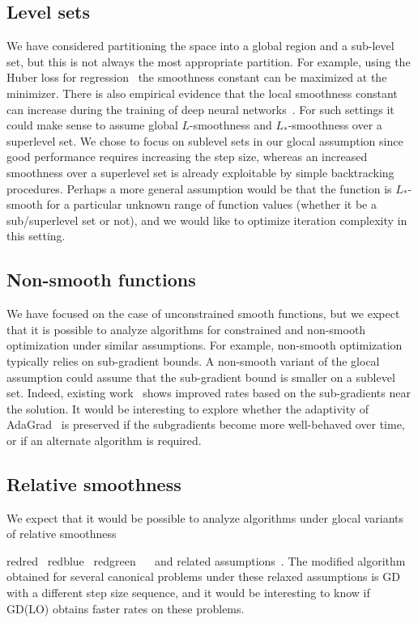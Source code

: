\documentclass[10pt]{article} %
\newif\ifshowcolours
\def\red{red}
\def\blue{blue}
\def\green{green}
\renewcommand{\textcolor}[2]{%
  \ifshowcolours
    {\color{#1}#2}%
  \else
    \def\temp{#1}%
    \ifx\temp\red     #2\else
    \ifx\temp\blue    #2\else
    \ifx\temp\green   #2\else
        {\color{#1}#2}%
    \fi\fi\fi
  \fi
}
\begin{document}
\subsection{Level sets} We have considered partitioning the space into a global region and a sub-level set, but this is not always the most appropriate partition. For example, using the Huber loss for regression~\cite{hastie2017elements} the smoothness constant can be maximized at the minimizer. There is also empirical evidence that the local smoothness constant can increase during the training of deep neural networks~\cite{cohen2021gradient,tran2024empirical}. For such settings it could make sense to assume global $L$-smoothness and $L_*$-smoothness over a superlevel set. We chose to focus on sublevel sets in our glocal assumption since good performance requires increasing the step size, whereas an increased smoothness over a superlevel set is already exploitable by simple backtracking procedures.
 Perhaps a more general assumption would be that the function is $L_*$-smooth for a particular unknown range of function values (whether it be a sub/superlevel set or not), and we would like to optimize iteration complexity in this setting.

\subsection{Non-smooth functions} We have focused on the case of unconstrained smooth functions, but we expect that it is possible to analyze algorithms for constrained and non-smooth optimization under similar assumptions. For example, non-smooth optimization typically relies on sub-gradient bounds. A non-smooth variant of the glocal assumption could assume that the sub-gradient bound is smaller on a sublevel set. Indeed, existing work~\cite{diakonikolas2024optimization} shows improved rates based on the sub-gradients near the solution. It would be interesting to explore whether the adaptivity of AdaGrad~\cite{duchi2011adaptive} is preserved if the subgradients become more well-behaved over time, or if an alternate algorithm is required.

\subsection{Relative smoothness} We expect that it would be possible to analyze algorithms under glocal variants of relative smoothness\textcolor{red}{~\cite{BauschkeBT17, LuFN18}} and related assumptions~\cite{maddison2018hamiltonian,wilson2019accelerating}. The modified algorithm obtained for several canonical problems under these relaxed assumptions is GD with a different step size sequence, and it would be interesting to know if GD(LO) obtains faster rates on these problems.
\end{document}

